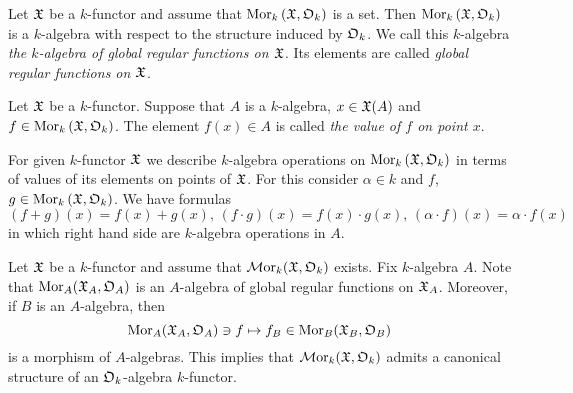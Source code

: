 \begin{definition}
Let ${\mathfrak X}$ be a $k$-functor and assume that $\mathrm{Mor}_k\left({\mathfrak X}, {\mathfrak O}_k\right)$ is a set. Then $\mathrm{Mor}_k\left({\mathfrak X}, {\mathfrak O}_k\right)$ is a $k$-algebra with respect to the structure induced by ${\mathfrak O}_k$. We call this $k$-algebra \textit{the $k$-algebra of global regular functions on ${\mathfrak X}$}. Its elements are called \textit{global regular functions on ${\mathfrak X}$}.
\end{definition}

\begin{definition}
Let ${\mathfrak X}$ be a $k$-functor. Suppose that $A$ is a $k$-algebra, $x\in {\mathfrak X}(A)$ and $f\in \mathrm{Mor}_k\left({\mathfrak X},{\mathfrak O}_k\right)$. The element $f(x) \in A$ is called \textit{the value of $f$ on point $x$}.
\end{definition}
\noindent
For given $k$-functor ${\mathfrak X}$ we describe $k$-algebra operations on $\mathrm{Mor}_k\left({\mathfrak X},{\mathfrak O}_k\right)$ in terms of values of its elements on points of ${\mathfrak X}$. For this consider $\alpha \in k$ and $f$, $g\in \mathrm{Mor}_k\left({\mathfrak X}, {\mathfrak O}_k\right)$. We have formulas
$$\left(f+g\right)(x) = f(x)+g(x),\,\left(f\cdot g\right)(x) = f(x)\cdot g(x),\,\left(\alpha \cdot f\right)(x) = \alpha \cdot f(x)$$
in which right hand side are $k$-algebra operations in $A$.

\begin{example}\label{example:regular_functions_as_an_algebra_over_structure_algebra}
Let ${\mathfrak X}$ be a $k$-functor and assume that $\mathcal{M}\mathrm{or}_k({\mathfrak X},{\mathfrak O}_k)$ exists. Fix $k$-algebra $A$. Note that $\mathrm{Mor}_A({\mathfrak X}_A,{\mathfrak O}_A)$ is an $A$-algebra of global regular functions on ${\mathfrak X}_A$. Moreover, if $B$ is an $A$-algebra, then
$$\mathrm{Mor}_A({\mathfrak X}_A,{\mathfrak O}_A) \ni f \mapsto f_B\in \mathrm{Mor}_B({\mathfrak X}_B,{\mathfrak O}_B)$$
is a morphism of $A$-algebras. This implies that $\mathcal{M}\mathrm{or}_k({\mathfrak X},{\mathfrak O}_k)$ admits a canonical structure of an ${\mathfrak O}_k$-algebra $k$-functor.
\end{example}

